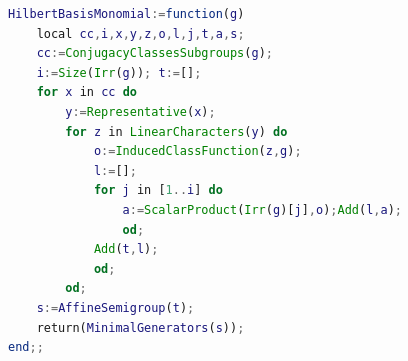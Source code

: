 \begin{lstlisting}[language=GAP]
HilbertBasisMonomial:=function(g)
    local cc,i,x,y,z,o,l,j,t,a,s;
    cc:=ConjugacyClassesSubgroups(g);
    i:=Size(Irr(g)); t:=[];
    for x in cc do
        y:=Representative(x);
        for z in LinearCharacters(y) do
            o:=InducedClassFunction(z,g);
            l:=[];
            for j in [1..i] do
                a:=ScalarProduct(Irr(g)[j],o);Add(l,a);
                od;
            Add(t,l);
            od;
        od;
    s:=AffineSemigroup(t);
    return(MinimalGenerators(s));
end;;
\end{lstlisting}